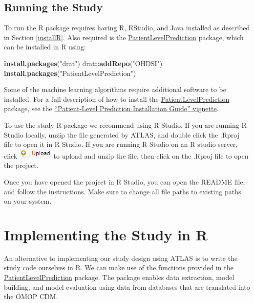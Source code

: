 \documentclass[11pt]{book}
\newenvironment{Shaded}{\begin{snugshade}}{\end{snugshade}}
\newcommand{\KeywordTok}[1]{\textcolor[rgb]{0.13,0.29,0.53}{\textbf{#1}}}
\newcommand{\StringTok}[1]{\textcolor[rgb]{0.31,0.60,0.02}{#1}}
\newcommand{\OperatorTok}[1]{\textcolor[rgb]{0.81,0.36,0.00}{\textbf{#1}}}
\newcommand{\NormalTok}[1]{#1}
\theoremstyle{definition}
\theoremstyle{definition}
\theoremstyle{definition}
\theoremstyle{remark}
\begin{document}
\subsection{Running the Study}\label{running-the-study}

To run the R package requires having R, RStudio, and Java installed as
described in Section \ref{installR}. Also required is the
\href{https://ohdsi.github.io/PatientLevelPrediction/}{PatientLevelPrediction}
package, which can be installed in R using:

\begin{Shaded}
\begin{Highlighting}[]
\KeywordTok{install.packages}\NormalTok{(}\StringTok{"drat"}\NormalTok{)}
\NormalTok{drat}\OperatorTok{::}\KeywordTok{addRepo}\NormalTok{(}\StringTok{"OHDSI"}\NormalTok{)}
\KeywordTok{install.packages}\NormalTok{(}\StringTok{"PatientLevelPrediction"}\NormalTok{)}
\end{Highlighting}
\end{Shaded}

Some of the machine learning algorithms require additional software to
be installed. For a full description of how to install the
\href{https://ohdsi.github.io/PatientLevelPrediction/}{PatientLevelPrediction}
package, see the
\href{https://ohdsi.github.io/PatientLevelPrediction/articles/InstallationGuide.html}{``Patient-Level
Prediction Installation Guide'' vignette}.

To use the study R package we recommend using R Studio. If you are
running R Studio locally, unzip the file generated by ATLAS, and double
click the .Rproj file to open it in R Studio. If you are running R
Studio on an R studio server, click
\includegraphics{images/PopulationLevelEstimation/upload.png} to upload
and unzip the file, then click on the .Rproj file to open the project.

Once you have opened the project in R Studio, you can open the README
file, and follow the instructions. Make sure to change all file paths to
existing paths on your system.

\section{Implementing the Study in R}\label{implementing-the-study-in-r}

An alternative to implementing our study design using ATLAS is to write
the study code ourselves in R. We can make use of the functions provided
in the
\href{https://ohdsi.github.io/PatientLevelPrediction/}{PatientLevelPrediction}
package. The package enables data extraction, model building, and model
evaluation using data from databases that are translated into the OMOP
CDM.
\end{document}
